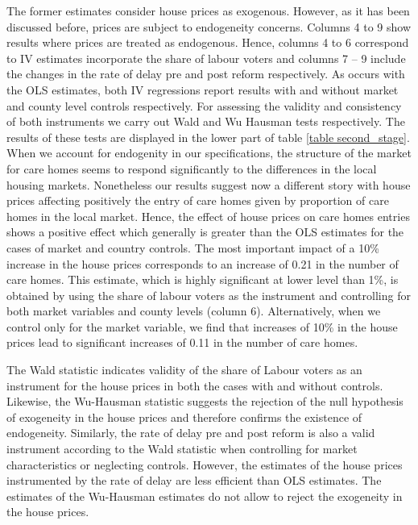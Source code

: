 \documentclass[12pt,letterpaper]{article}
\begin{document}
The former estimates consider house prices as exogenous. However, as it has been discussed before, 
prices are subject to endogeneity concerns. Columns 4 to 9 show results where prices are treated as
 endogenous. Hence, columns 4 to 6 correspond to IV estimates incorporate the share of labour voters and columns
  7 – 9 include the changes in the rate of delay pre and post reform respectively. 
   As occurs with the OLS estimates, both IV regressions report results with and without 
   market and county level controls respectively. For assessing the validity and consistency of both instruments 
   we carry out Wald and Wu Hausman tests respectively. The results of these tests are displayed in the lower part
    of table \ref{table second_stage}. When we account for endogenity in our specifications, 
    the structure of the market for care homes seems to respond significantly to the differences in the local 
    housing markets. Nonetheless our results suggest now a different story with house prices affecting positively
     the entry of care homes given by proportion of care homes in the local market. Hence, the effect of house 
     prices on care homes entries shows a positive effect which generally is greater than the OLS estimates
      for the cases of market and country controls. The most important impact of a 10\% increase in the house
       prices corresponds to an increase of 0.21 in the number of care homes. This estimate, which is highly
        significant at lower level than 1\%, is obtained by using the share of labour voters as the instrument and 
        controlling for both market variables and county levels (column 6). Alternatively, when we control only for
         the market variable, we find that increases of 10\% in the house prices lead to significant increases of 0.11
          in the number of care homes. 
          
The Wald statistic indicates validity of the share of Labour voters as an instrument for the house prices in both
 the cases with and without controls. Likewise, the Wu-Hausman statistic suggests the rejection of the null 
 hypothesis of exogeneity in the house prices and therefore confirms the existence of endogeneity. Similarly,
  the rate of delay pre and post reform is also a valid instrument according to the Wald statistic when controlling 
  for market characteristics or neglecting controls. However, the estimates of the house prices instrumented by
   the rate of delay are less efficient than OLS estimates. The estimates of the Wu-Hausman estimates do not 
   allow to reject the exogeneity in the house prices.  
   
\end{document}

